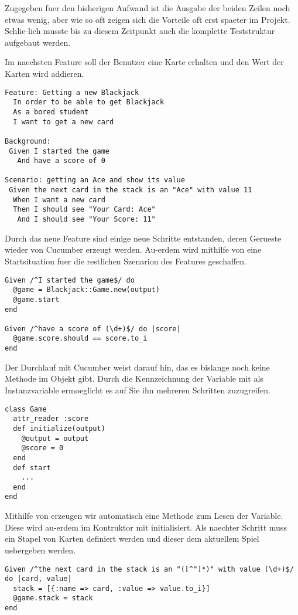 Zugegeben fuer den bisherigen Aufwand ist die Ausgabe der beiden Zeilen noch etwas wenig, aber wie so oft zeigen sich die Vorteile oft erst spaeter im Projekt. Schlie-lich musste bis zu diesem Zeitpunkt auch die komplette Teststruktur aufgebaut werden.

Im naechsten Feature soll der Benutzer eine Karte erhalten und den Wert der Karten wird addieren.
\begin{lstlisting}
Feature: Getting a new Blackjack
  In order to be able to get Blackjack
  As a bored student
  I want to get a new card

Background:
 Given I started the game
   And have a score of 0

Scenario: getting an Ace and show its value
 Given the next card in the stack is an "Ace" with value 11
  When I want a new card
  Then I should see "Your Card: Ace"
   And I should see "Your Score: 11"
\end{lstlisting}

Durch das neue Feature sind einige neue Schritte entstanden, deren Gerueste wieder von Cucumber erzeugt werden.
Au-erdem wird mithilfe von  eine Startsituation fuer die restlichen Szenarion des Features geschaffen.

\begin{lstlisting}
Given /^I started the game$/ do
  @game = Blackjack::Game.new(output)
  @game.start
end

Given /^have a score of (\d+)$/ do |score|
  @game.score.should == score.to_i
end
\end{lstlisting}

Der Durchlauf mit Cucumber weist darauf hin, das es bislange noch keine Methode  im  Objekt gibt.
Durch die Kennzeichnung der Variable mit  als Instanzvariable ermoeglicht es auf Sie ihn mehreren Schritten zuzugreifen.

\begin{lstlisting}
class Game
  attr_reader :score
  def initialize(output)
    @output = output
    @score = 0
  end
  def start
    ...
  end
end
\end{lstlisting}

Mithilfe von  erzeugen wir automatisch eine Methode zum Lesen der  Variable. Diese wird au-erdem im Kontruktor mit  initialisiert.
Als naechter Schritt muss ein Stapel von Karten definiert werden und dieser dem aktuellem Spiel uebergeben werden.

\begin{lstlisting}
Given /^the next card in the stack is an "([^"]*)" with value (\d+)$/ do |card, value|
  stack = [{:name => card, :value => value.to_i}]
  @game.stack = stack
end
\end{lstlisting}


